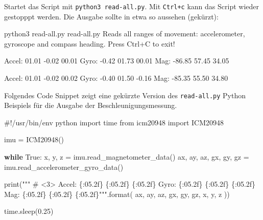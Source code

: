 \documentclass[
  11pt,
  a4paper,
  oneside, openany  ,captions=tableheading
]{scrbook}
\newenvironment{Shaded}{\begin{snugshade}}{\end{snugshade}}
\newcommand{\AttributeTok}[1]{\textcolor[rgb]{0.40,0.45,0.13}{#1}}
\newcommand{\BuiltInTok}[1]{\textcolor[rgb]{0.00,0.23,0.31}{#1}}
\newcommand{\CommentTok}[1]{\textcolor[rgb]{0.37,0.37,0.37}{#1}}
\newcommand{\ControlFlowTok}[1]{\textcolor[rgb]{0.00,0.23,0.31}{\textbf{#1}}}
\newcommand{\ExtensionTok}[1]{\textcolor[rgb]{0.00,0.23,0.31}{#1}}
\newcommand{\FloatTok}[1]{\textcolor[rgb]{0.68,0.00,0.00}{#1}}
\newcommand{\ImportTok}[1]{\textcolor[rgb]{0.00,0.46,0.62}{#1}}
\newcommand{\NormalTok}[1]{\textcolor[rgb]{0.00,0.23,0.31}{#1}}
\newcommand{\OperatorTok}[1]{\textcolor[rgb]{0.37,0.37,0.37}{#1}}
\newcommand{\SpecialCharTok}[1]{\textcolor[rgb]{0.37,0.37,0.37}{#1}}
\newcommand{\StringTok}[1]{\textcolor[rgb]{0.13,0.47,0.30}{#1}}
\newcommand{\VariableTok}[1]{\textcolor[rgb]{0.07,0.07,0.07}{#1}}
\theoremstyle{remark}
\newcommand*\circled[1]{\tikz[baseline=(char.base)]{
          \node[shape=circle,draw,inner sep=1pt] (char) {{\scriptsize#1}};}}
\begin{document}
Startet das Script mit \texttt{python3\ read-all.py}. Mit
\texttt{Ctrl+c} kann das Script wieder gestopppt werden. Die Ausgabe
sollte in etwa so aussehen (gekürzt):

\begin{Shaded}
\begin{Highlighting}[]
\ExtensionTok{python3}\NormalTok{ read{-}all.py}
\ExtensionTok{read{-}all.py}
\ExtensionTok{Reads}\NormalTok{ all ranges of movement: accelerometer, gyroscope and compass heading.}
\ExtensionTok{Press}\NormalTok{ Ctrl+C to exit!}

\ExtensionTok{Accel:}\NormalTok{ 01.01 }\AttributeTok{{-}0.02}\NormalTok{ 00.01}
\ExtensionTok{Gyro:}  \AttributeTok{{-}0.42}\NormalTok{ 01.73 00.01}
\ExtensionTok{Mag:}   \AttributeTok{{-}86.85}\NormalTok{ 57.45 34.05}

\ExtensionTok{Accel:}\NormalTok{ 01.01 }\AttributeTok{{-}0.02}\NormalTok{ 00.02}
\ExtensionTok{Gyro:}  \AttributeTok{{-}0.40}\NormalTok{ 01.50 }\AttributeTok{{-}0.16}
\ExtensionTok{Mag:}   \AttributeTok{{-}85.35}\NormalTok{ 55.50 34.80}
\end{Highlighting}
\end{Shaded}

Folgendes Code Snippet zeigt eine gekürzte Version des
\texttt{read-all.py} Python Beispiels für die Ausgabe der
Beschleunigungsmessung.

\label{annotated-cell-17}%
\begin{Shaded}
\begin{Highlighting}[]
\CommentTok{\#!/usr/bin/env python}
\ImportTok{import}\NormalTok{ time}
\ImportTok{from}\NormalTok{ icm20948 }\ImportTok{import}\NormalTok{ ICM20948}

\NormalTok{imu }\OperatorTok{=}\NormalTok{ ICM20948()}

\ControlFlowTok{while} \VariableTok{True}\NormalTok{:}
\NormalTok{    x, y, z }\OperatorTok{=}\NormalTok{ imu.read\_magnetometer\_data() }\hspace*{\fill}\NormalTok{\circled{1}}
\NormalTok{    ax, ay, az, gx, gy, gz }\OperatorTok{=}\NormalTok{ imu.read\_accelerometer\_gyro\_data() }\hspace*{\fill}\NormalTok{\circled{2}}

    \BuiltInTok{print}\NormalTok{(}\StringTok{""" \# \textless{}3\textgreater{}}
\StringTok{Accel: }\SpecialCharTok{\{:05.2f\}}\StringTok{ }\SpecialCharTok{\{:05.2f\}}\StringTok{ }\SpecialCharTok{\{:05.2f\}}
\StringTok{Gyro:  }\SpecialCharTok{\{:05.2f\}}\StringTok{ }\SpecialCharTok{\{:05.2f\}}\StringTok{ }\SpecialCharTok{\{:05.2f\}}
\StringTok{Mag:   }\SpecialCharTok{\{:05.2f\}}\StringTok{ }\SpecialCharTok{\{:05.2f\}}\StringTok{ }\SpecialCharTok{\{:05.2f\}}\StringTok{"""}\NormalTok{.}\BuiltInTok{format}\NormalTok{(}
\NormalTok{        ax, ay, az, gx, gy, gz, x, y, z}
\NormalTok{        ))}

\NormalTok{    time.sleep(}\FloatTok{0.25}\NormalTok{) }\hspace*{\fill}\NormalTok{\circled{4}}
\end{Highlighting}
\end{Shaded}
\end{document}
